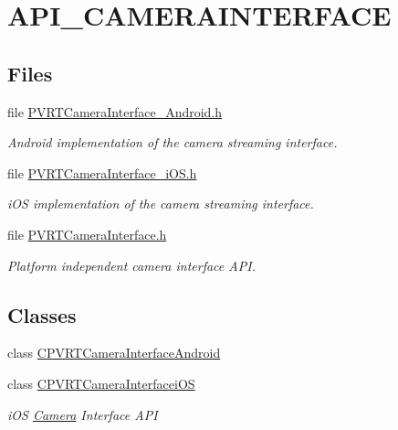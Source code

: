 \hypertarget{group___a_p_i___c_a_m_e_r_a_i_n_t_e_r_f_a_c_e}{\section{A\+P\+I\+\_\+\+C\+A\+M\+E\+R\+A\+I\+N\+T\+E\+R\+F\+A\+C\+E}
\label{group___a_p_i___c_a_m_e_r_a_i_n_t_e_r_f_a_c_e}
}
\subsection*{Files}
\begin{DoxyCompactItemize}
\item 
file \hyperlink{_p_v_r_t_camera_interface___android_8h}{P\+V\+R\+T\+Camera\+Interface\+\_\+\+Android.\+h}
\begin{DoxyCompactList}\small\item\em Android implementation of the camera streaming interface. \end{DoxyCompactList}\item 
file \hyperlink{_p_v_r_t_camera_interface__i_o_s_8h}{P\+V\+R\+T\+Camera\+Interface\+\_\+i\+O\+S.\+h}
\begin{DoxyCompactList}\small\item\em i\+O\+S implementation of the camera streaming interface. \end{DoxyCompactList}\item 
file \hyperlink{_p_v_r_t_camera_interface_8h}{P\+V\+R\+T\+Camera\+Interface.\+h}
\begin{DoxyCompactList}\small\item\em Platform independent camera interface A\+P\+I. \end{DoxyCompactList}\end{DoxyCompactItemize}
\subsection*{Classes}
\begin{DoxyCompactItemize}
\item 
class \hyperlink{class_c_p_v_r_t_camera_interface_android}{C\+P\+V\+R\+T\+Camera\+Interface\+Android}
\item 
class \hyperlink{class_c_p_v_r_t_camera_interfacei_o_s}{C\+P\+V\+R\+T\+Camera\+Interfacei\+O\+S}
\begin{DoxyCompactList}\small\item\em i\+O\+S \hyperlink{class_camera}{Camera} Interface A\+P\+I \end{DoxyCompactList}\end{DoxyCompactItemize}
